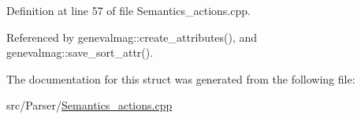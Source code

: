 Definition at line 57 of file Semantics\_\-actions.cpp.

Referenced by genevalmag::create\_\-attributes(), and genevalmag::save\_\-sort\_\-attr().

The documentation for this struct was generated from the following file:\begin{CompactItemize}
\item 
src/Parser/\hyperlink{Semantics__actions_8cpp}{Semantics\_\-actions.cpp}\end{CompactItemize}
